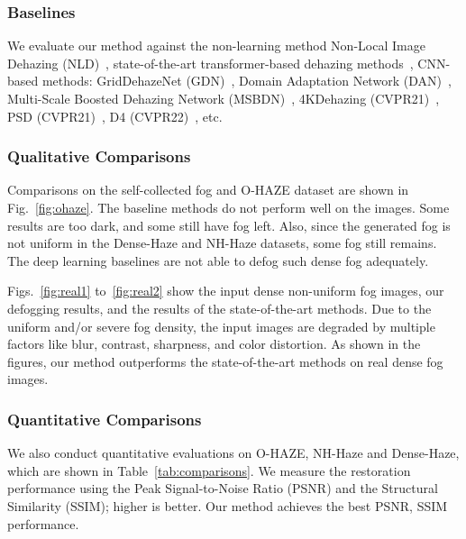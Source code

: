 \documentclass[runningheads]{llncs}
\begin{document}
\subsubsection{Baselines}
We evaluate our method against the non-learning method Non-Local Image Dehazing (NLD)~\cite{berman2018single}, state-of-the-art transformer-based dehazing methods~\cite{guo2022image,song2022vision}, CNN-based methods: GridDehazeNet (GDN)~\cite{liu2019griddehazenet}, Domain Adaptation Network (DAN)~\cite{shao2020domain}, Multi-Scale Boosted Dehazing Network (MSBDN)~\cite{dong2020multi}, 4KDehazing (CVPR21)~\cite{zheng2021ultra}, PSD (CVPR21)~\cite{chen2021psd}, D4 (CVPR22)~\cite{yang2022self}, etc.

\subsubsection{Qualitative Comparisons}
Comparisons on the self-collected fog and O-HAZE dataset are shown in Fig.~\ref{fig:ohaze}.
The baseline methods do not perform well on the images. Some results are too dark, and some still have fog left. 
Also, since the generated fog is not uniform in the Dense-Haze and NH-Haze datasets, some fog still remains. 
The deep learning baselines are not able to defog such dense fog adequately.

Figs.~\ref{fig:real1} to~\ref{fig:real2} show the input dense non-uniform fog images, our defogging results, and the results of the state-of-the-art methods.
Due to the uniform and/or severe fog density, the input images are degraded by multiple factors like blur, contrast, sharpness, and color distortion. 
As shown in the figures, our method outperforms the state-of-the-art methods on real dense fog images.

\subsubsection{Quantitative Comparisons}
We also conduct quantitative evaluations on O-HAZE, NH-Haze and Dense-Haze, which are shown in Table~\ref{tab:comparisons}. 
We measure the restoration performance using the Peak Signal-to-Noise Ratio (PSNR) and the Structural Similarity (SSIM); higher is better.
Our method achieves the best PSNR, SSIM performance.
\end{document}
